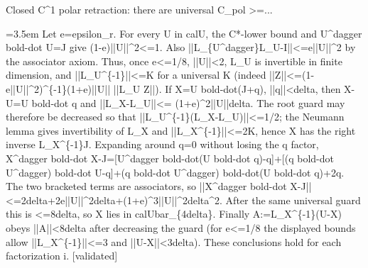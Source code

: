 \documentclass{article}
\newcommand{\step}[1]{\par\noindent\hangindent=3.5em\hangafter=1%
  \makebox[3.5em][l]{\textbf{#1.}}}
\newcommand{\steptag}[1]{\hfill{\small\textsf{[#1]}}}
\begin{document}
\begin{proofbox}{Closed C\textasciicircum{}1 polar retraction: there are universal C\_pol >=...}
\step{1.3.2.1} Let e=epsilon\_r. For every U in calU, the C*-lower bound and U\textasciicircum{}dagger bold-dot U=J give (1-e)||U||\textasciicircum{}2<=1. Also ||L\_\{U\textasciicircum{}dagger\}L\_U-I||<=e||U||\textasciicircum{}2 by the associator axiom. Thus, once e<=1/8, ||U||<2, L\_U is invertible in finite dimension, and ||L\_U\textasciicircum{}\{-1\}||<=K for a universal K (indeed ||Z||<=(1-e||U||\textasciicircum{}2)\textasciicircum{}\{-1\}(1+e)||U|| ||L\_U Z||). If X=U bold-dot(J+q), ||q||<delta, then X-U=U bold-dot q and ||L\_X-L\_U||<= (1+e)\textasciicircum{}2||U||delta. The root guard may therefore be decreased so that ||L\_U\textasciicircum{}\{-1\}(L\_X-L\_U)||<=1/2; the Neumann lemma gives invertibility of L\_X and ||L\_X\textasciicircum{}\{-1\}||<=2K, hence X has the right inverse L\_X\textasciicircum{}\{-1\}J. Expanding around q=0 without losing the q factor, X\textasciicircum{}dagger bold-dot X-J=[U\textasciicircum{}dagger bold-dot(U bold-dot q)-q]+[(q bold-dot U\textasciicircum{}dagger) bold-dot U-q]+(q bold-dot U\textasciicircum{}dagger) bold-dot(U bold-dot q)+2q. The two bracketed terms are associators, so ||X\textasciicircum{}dagger bold-dot X-J||<=2delta+2e||U||\textasciicircum{}2delta+(1+e)\textasciicircum{}3||U||\textasciicircum{}2delta\textasciicircum{}2. After the same universal guard this is <=8delta, so X lies in calUbar\_\{4delta\}. Finally A:=L\_X\textasciicircum{}\{-1\}(U-X) obeys ||A||<8delta after decreasing the guard (for e<=1/8 the displayed bounds allow ||L\_X\textasciicircum{}\{-1\}||<=3 and ||U-X||<3delta). These conclusions hold for each factorization i. \steptag{validated} \\[4pt]

\end{proofbox}
\end{document}
